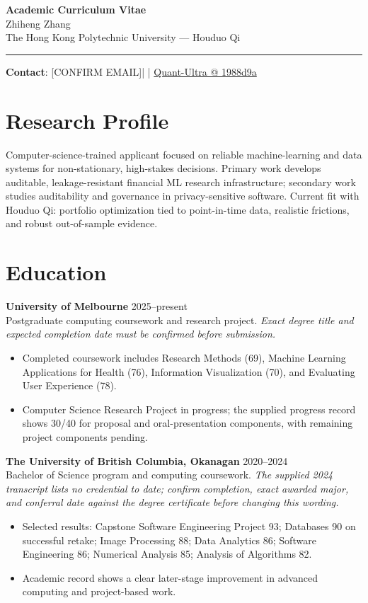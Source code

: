 \documentclass[11pt]{article}
\makeatletter
\newcommand{\ApplicantName}{Zhiheng Zhang}
\newcommand{\ApplicantEmail}{[CONFIRM EMAIL]}
\newcommand{\ApplicantPhone}{[CONFIRM PHONE]}
\newcommand{\ApplicantGitHub}{\href{https://github.com/zhiheng-zhang-Mera/Quant-Ultra/tree/1988d9a8530da91a8158de864d098ea869098923}{Quant-Ultra @ 1988d9a}}
\makeatother
\begin{document}
\begin{center}
{\LARGE\bfseries Academic Curriculum Vitae}\\[0.25em]
{\large \ApplicantName}\\
The Hong Kong Polytechnic University --- Houduo Qi
\end{center}
\vspace{0.35em}\hrule\vspace{0.65em}

\textbf{Contact}: \ApplicantEmail\quad | \quad \ApplicantPhone\quad | \quad \ApplicantGitHub

\section*{Research Profile}
Computer-science-trained applicant focused on reliable machine-learning and data systems for non-stationary, high-stakes decisions. Primary work develops auditable, leakage-resistant financial ML research infrastructure; secondary work studies auditability and governance in privacy-sensitive software. Current fit with Houduo Qi: portfolio optimization tied to point-in-time data, realistic frictions, and robust out-of-sample evidence.

\section*{Education}
\textbf{University of Melbourne} \hfill 2025--present\\
Postgraduate computing coursework and research project. \textit{Exact degree title and expected completion date must be confirmed before submission.}
\begin{itemize}
\item Completed coursework includes Research Methods (69), Machine Learning Applications for Health (76), Information Visualization (70), and Evaluating User Experience (78).
\item Computer Science Research Project in progress; the supplied progress record shows 30/40 for proposal and oral-presentation components, with remaining project components pending.
\end{itemize}

\textbf{The University of British Columbia, Okanagan} \hfill 2020--2024\\
Bachelor of Science program and computing coursework. \textit{The supplied 2024 transcript lists no credential to date; confirm completion, exact awarded major, and conferral date against the degree certificate before changing this wording.}
\begin{itemize}
\item Selected results: Capstone Software Engineering Project 93; Databases 90 on successful retake; Image Processing 88; Data Analytics 86; Software Engineering 86; Numerical Analysis 85; Analysis of Algorithms 82.
\item Academic record shows a clear later-stage improvement in advanced computing and project-based work.
\end{itemize}
\end{document}
